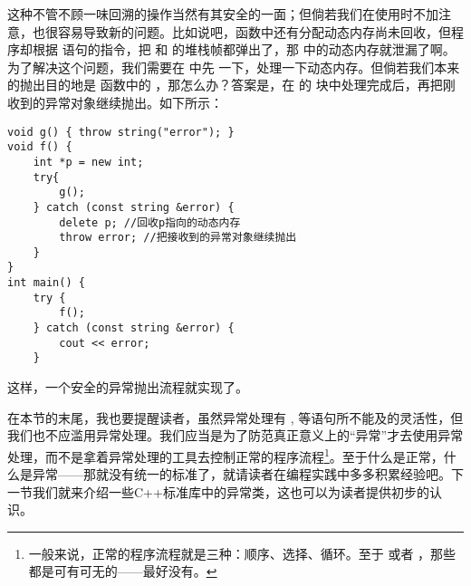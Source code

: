 这种不管不顾一味回溯的操作当然有其安全的一面；但倘若我们在使用时不加注意，也很容易导致新的问题。比如说吧，\lstinline@f@ 函数中还有分配动态内存尚未回收，但程序却根据 \lstinline@throw@ 语句的指令，把 \lstinline@g@ 和 \lstinline@f@ 的堆栈帧都弹出了，那 \lstinline@f@ 中的动态内存就泄漏了啊。为了解决这个问题，我们需要在 \lstinline@f@ 中先 \lstinline@catch@ 一下，处理一下动态内存。但倘若我们本来的抛出目的地是 \lstinline@main@ 函数中的 \lstinline@catch@，那怎么办？答案是，在 \lstinline@f@ 的 \lstinline@catch@ 块中处理完成后，再把刚收到的异常对象继续抛出。如下所示：
\begin{lstlisting}
void g() { throw string("error"); }
void f() {
    int *p = new int;
    try{
        g();
    } catch (const string &error) {
        delete p; //回收p指向的动态内存
        throw error; //把接收到的异常对象继续抛出
    }
}
int main() {
    try {
        f();
    } catch (const string &error) {
        cout << error;
    }
\end{lstlisting}
这样，一个安全的异常抛出流程就实现了。\par
在本节的末尾，我也要提醒读者，虽然异常处理有 \lstinline@break@, \lstinline@return@ 等语句所不能及的灵活性，但我们也不应滥用异常处理。我们应当是为了防范真正意义上的``异常''才去使用异常处理，而不是拿着异常处理的工具去控制正常的程序流程\footnote{一般来说，正常的程序流程就是三种：顺序、选择、循环。至于 \lstinline@goto@ 或者 \lstinline@throw@，那些都是可有可无的——最好没有。}。至于什么是正常，什么是异常——那就没有统一的标准了，就请读者在编程实践中多多积累经验吧。下一节我们就来介绍一些C++标准库中的异常类，这也可以为读者提供初步的认识。\par
